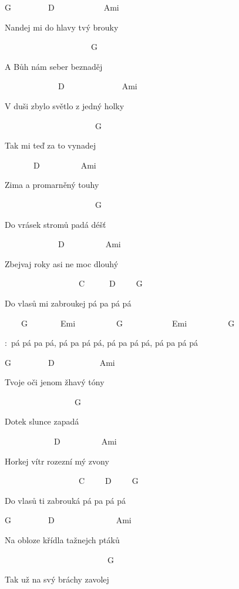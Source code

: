 
G~~~~~~~~~D~~~~~~~~~~~~Ami~~~

Nandej mi do hlavy tvý brouky

~~~~~~~~~~~~~~~~~~~~~G~~

A Bůh nám seber beznaděj

~~~~~~~~~~~~~D~~~~~~~~~~~~~~Ami~~

V duši zbylo světlo z jedný holky

~~~~~~~~~~~~~~~~~~~~~~G~

Tak mi teď za to vynadej

~~~~~~~D~~~~~~~~~~Ami~~

Zima a promarněný touhy

~~~~~~~~~~~~~~~~~~~~~~G~~~

Do vrásek stromů padá déšť

~~~~~~~~~~~~~D~~~~~~~~~~Ami~~~

Zbejvaj roky asi ne moc dlouhý

~~~~~~~~~~~~~~~~~~C~~~~~~D~~~~~G~

Do vlasů mi zabroukej pá pa pá pá

\bigskip

\begin{chorustext}

~~~~G~~~~~~~~Emi~~~~~~~~~~G~~~~~~~~~~~~Emi~~~~~~~~~~G~~

\chorus:~pá pá pa pá, pá pa pá pá, pá pa pá pá, pá pa pá pá

\end{chorustext}

\bigskip

G~~~~~~~~~D~~~~~~~~~~~Ami~

Tvoje oči jenom žhavý tóny

~~~~~~~~~~~~~~~~~G~

Dotek slunce zapadá

~~~~~~~~~~~~D~~~~~~~~~~Ami~~

Horkej vítr rozezní mý zvony

~~~~~~~~~~~~~~~~~~C~~~~~D~~~~~G~

Do vlasů ti zabrouká pá pa pá pá

\bigskip

\chorus \chorus

\bigskip

G~~~~~~~~~D~~~~~~~~~~~~~~~Ami~~

Na obloze křídla tažnejch ptáků

~~~~~~~~~~~~~~~~~~~~~~~~~G~~

Tak už na svý bráchy zavolej


